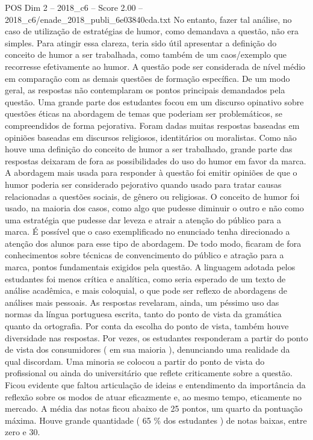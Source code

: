 \begin{textsample}{POS Dim 2 – 2018\_c6 – Score 2.00 – 2018\_c6/enade\_2018\_publi\_6e03840cda.txt}
No entanto, fazer tal análise, no caso de utilização de estratégias de humor, como demandava a questão, não era simples.
Para atingir essa clareza, teria sido útil apresentar a definição do conceito de humor a ser trabalhada, como também de um caos/exemplo que recorresse efetivamente ao humor.
A questão pode ser considerada de nível médio em comparação com as demais questões de formação específica.
De um modo geral, as respostas não contemplaram os pontos principais demandados pela questão.
Uma grande parte dos estudantes focou em um discurso opinativo sobre questões éticas na abordagem de temas que poderiam ser problemáticos, se compreendidos de forma pejorativa.
Foram dadas muitas respostas baseadas em opiniões baseadas em discursos religiosos, identitários ou moralistas.
Como não houve uma definição do conceito de humor a ser trabalhado, grande parte das respostas deixaram de fora as possibilidades do uso do humor em favor da marca.
A abordagem mais usada para responder à questão foi emitir opiniões de que o humor poderia ser considerado pejorativo quando usado para tratar causas relacionadas a questões sociais, de gênero ou religiosas.
O conceito de humor foi usado, na maioria dos casos, como algo que pudesse diminuir o outro e não como uma estratégia que pudesse dar leveza e atrair a atenção do público para a marca.
É possível que o caso exemplificado no enunciado tenha direcionado a atenção dos alunos para esse tipo de abordagem.
De todo modo, ficaram de fora conhecimentos sobre técnicas de convencimento do público e atração para a marca, pontos fundamentais exigidos pela questão.
A linguagem adotada pelos estudantes foi menos crítica e analítica, como seria esperado de um texto de análise acadêmica, e mais coloquial, o que pode ser reflexo de abordagens de análises mais pessoais.
As respostas revelaram, ainda, um péssimo uso das normas da língua portuguesa escrita, tanto do ponto de vista da gramática quanto da ortografia.
Por conta da escolha do ponto de vista, também houve diversidade nas respostas.
Por vezes, os estudantes responderam a partir do ponto de vista dos consumidores ( em sua maioria ), denunciando uma realidade da qual discordam.
Uma minoria se colocou a partir do ponto de vista do profissional ou ainda do universitário que reflete criticamente sobre a questão.
Ficou evidente que faltou articulação de ideias e entendimento da importância da reflexão sobre os modos de atuar eficazmente e, ao mesmo tempo, eticamente no mercado.
A média das notas ficou abaixo de 25 pontos, um quarto da pontuação máxima.
Houve grande quantidade ( 65 \% dos estudantes ) de notas baixas, entre zero e 30.

\end{textsample}
